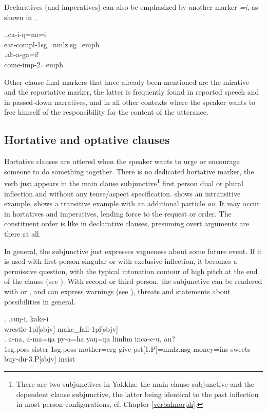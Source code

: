 Declaratives (and imperatives) can also be emphasized by another marker \emph{=i}, as shown in \Next. 

\ex.\ag.ca-i-ŋ=na=i\\
eat{\sc -compl-1sg=nmlz.sg=emph}\\
 
\bg.ab-a-ga=i!\\
come{\sc -imp-2=emph}\\

Other clause-final markers that have already been mentioned are the mirative and the reportative marker, the latter is frequently found in reported speech and in passed-down narratives, and in all other contexts where the speaker wants to free himself of the responsibility for the content of the utterance.

 
\subsection{Hortative and optative clauses}\label{clstr-opt}
 
Hortative clauses are uttered when the speaker wants to urge or encourage someone to do something together. There is no dedicated hortative marker, the verb just appears in the main clause subjunctive\footnote{There are two subjunctives in Yakkha: the main clause subjunctive and the dependent clause subjunctive, the latter being  identical to the past inflection in most person configurations, cf. Chapter \ref{verbalmorph}.}  first person dual or plural inflection and without any tense/aspect specification. \Next[a] shows an intransitive example, \Next[b] shows a transitive example with an additional particle \emph{au}. It may occur in hortatives and imperatives, lending force to the request or order.  The constituent order is like in declarative clauses, presuming  overt arguments are there at all.

In general, the subjunctive just expresses vagueness about some future event. If it is used with first person singular or with exclusive inflection, it becomes a permissive question, with the typical intonation contour of high pitch at the end of the clause (see \NNext[a]). With second or third person,  the subjunctive can be rendered with  or , and can express warnings (see \NNext[b]), threats \NNext[c] and statements about possibilities in general. 

\ex. \ag.cuŋ-i,    kaks-i\\
wrestle{\sc -1pl[sbjv]} make\_fall{\sc -1pl[sbjv]}\\
 
\bg. a-na,     a-ma=ŋa                py-a=ha   yaŋ=ŋa    limlim inca-c-u,       au?\\
{\sc 1sg.poss-}sister {\sc 1sg.poss-}mother{\sc =erg} give{\sc -pst[1.P]=nmlz.nsg} money{\sc =ins} sweets buy{\sc -du-3.P[sbjv]} {\sc insist}\\
 


